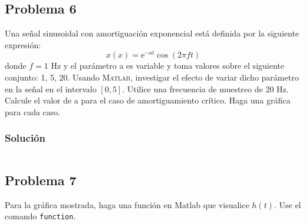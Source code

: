 \documentclass[a4paper,12pt,final]{article}
\begin{document}
      \vspace{\fill}

  \newpage
  \subsection*{Problema 6}
    \noindent Una señal sinusoidal con amortiguación exponencial está definida
    por la siguiente expresión:
    $$x\left(x\right) = \mathrm{e}^{-at}\cos\left(2\pi f t\right)$$
    donde $f = 1$ Hz y el parámetro a es variable y toma valores sobre el
    siguiente conjunto: 1, 5, 20. Usando \textsc{Matlab}, investigar el
    efecto de variar dicho parámetro en la señal en el intervalo $[0, 5]$.
    Utilice una frecuencia de muestreo de 20 Hz. Calcule el valor de a
    para el caso de amortiguamiento crítico. Haga una gráfica para cada
    caso.

    \subsubsection*{Solución}
      \begin{listing}[H]
        \caption{}
        \label{script06}
        \inputminted{matlab}{./laboratorio_2/problema06.m}
      \end{listing}

      \vspace{\fill}

  \newpage
  \subsection*{Problema 7}
    \noindent Para la gráfica mostrada, haga una función en Matlab que
    visualice $h(t)$. Use el comando \texttt{function}.
\end{document}
